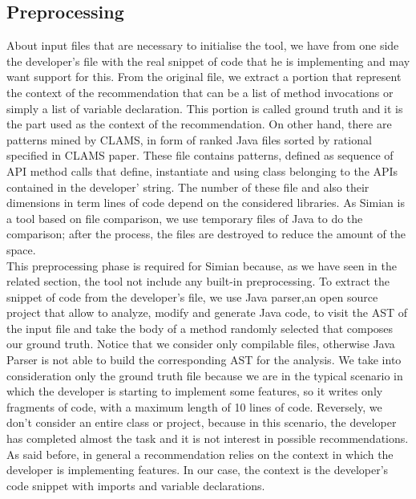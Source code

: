 \subsection{Preprocessing}

About input files that are necessary to initialise the tool, we have from one side the developer's file with the real snippet of code that he is implementing and may want support for this. From the original file, we extract a portion that represent the context of the recommendation that can be a list of method invocations or simply a list of variable declaration. This portion is called ground truth and it is the part used as the context of the recommendation. On other hand, there are patterns mined by CLAMS, in form of ranked Java files sorted by rational specified in CLAMS paper. These file contains patterns, defined as sequence of API method calls that define, instantiate and using class belonging to the APIs contained in the developer' string. The number of these file and also their dimensions in term lines of code depend on the considered libraries. As Simian is a tool based on file comparison, we use temporary files of Java to do the comparison; after the process, the files are destroyed to reduce the amount of the space. \\
This preprocessing phase is required for Simian because, as we have seen in the related section, the tool not include any built-in preprocessing. To extract the snippet of code from the developer's file, we use Java parser,an open source project that allow to analyze, modify and generate Java code, to visit the AST of the input file and take the body of a method randomly selected that composes our ground truth. Notice that we consider only compilable files, otherwise Java Parser is not able to build the corresponding AST for the analysis. We take into consideration only the ground truth file because we are in the typical scenario in which the developer is starting to implement some features, so it writes only fragments of code, with a maximum length of 10 lines of code. Reversely, we don't consider an entire class or project, because in this scenario, the developer has completed almost the task and it is not interest in possible recommendations. 
As said before, in general a recommendation relies on the context in which the developer is implementing features. In our case, the context is the developer's code snippet with imports and variable declarations.\\
